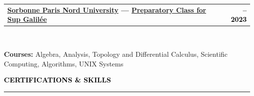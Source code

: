 \documentclass[10pt,english,french]{article}
\makeatletter
\newcommand{\certificateIcon}[1][black]{\textcolor{#1}{\faClipboard}}
\newlength{\mpwidth}
\newcommand{\cvsection}[1]{
    \vspace{4pt}
    \textbf{\fontsize{9pt}{10pt}\selectfont \textcolor{black}{#1}}
    \vspace{6pt}
    \hrule
    \vspace{6pt}
}
\newcommand{\cvtextnotab}[1]{
    \parbox{1\mpwidth}{#1}
}
\newcommand{\cvevent}[2]{
    \vspace{2pt}
    \parbox{\mpwidth}{
        \begin{tabular*}{1\mpwidth}{@{\extracolsep{\fill}} l r}
            \textcolor{black}{\textbf{\fontsize{11}{12}\selectfont #1}} & \textcolor{black}{\textbf{\fontsize{12}{12}\selectfont #2}} \\
        \end{tabular*}\\[-8pt] %
    }
}
\newcommand{\cvsubevent}[2]{
    \parbox{\mpwidth}{
        \begin{tabular*}{1\mpwidth}{@{\extracolsep{\fill}} l r}
            \textcolor{black}{\textit{\fontsize{10}{12}\selectfont #1}} & \textcolor{black}{\textit{\fontsize{10}{12}\selectfont #2}} \\
        \end{tabular*}\\[-8pt] %
    }
    \vspace{-10pt}
}
\makeatother
\begin{document}
\cvevent{\href{https://www.univ-spn.fr}{Sorbonne Paris Nord University} --- \href{https://www.sup-galilee.univ-paris13.fr/index.php/formation/cp2i/}{Preparatory Class for \textbf{Sup Galilée}}}{\fontsize{11pt}{11pt}\selectfont 2021\hspace{5pt}--\hspace{5pt}2023}

\vspace{-10pt}
\cvtextnotab{\textbf{Courses\!:} Algebra, Analysis, Topology and Differential Calculus, Scientific Computing, Algorithms, UNIX Systems}



\vspace{-14pt}
\cvsection{\certificateIcon[black]\hspace{4pt}CERTIFICATIONS \& SKILLS}
\end{document}

